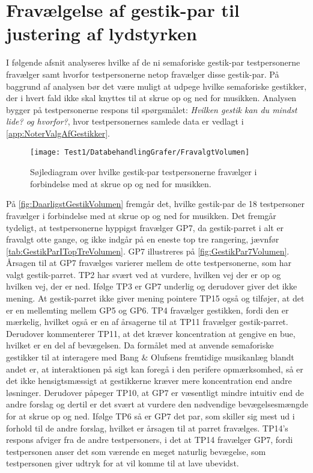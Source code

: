\section{Fravælgelse af gestik-par til justering af lydstyrken}
\label{app:TestresultaterVolumenDaarlig}
%
I følgende afsnit analyseres hvilke af de ni semaforiske gestik-par testpersonerne fravælger samt hvorfor testpersonerne netop fravælger disse gestik-par. På baggrund af analysen bør det være muligt at udpege hvilke semaforiske gestikker, der i hvert fald ikke skal knyttes til at skrue op og ned for musikken. Analysen bygger på testpersonerne respons til spørgsmålet: \textit{Hvilken gestik kan du mindst lide? og hvorfor?}, hvor testpersonernes samlede data er vedlagt i \autoref{app:NoterValgAfGestikker}.
%
\begin{figure}[H]
	\centering
	\texttt{[image: Test1/DatabehandlingGrafer/FravalgtVolumen]}
	\caption{Søjlediagram over hvilke gestik-par testpersonerne fravælger i forbindelse med at skrue op og ned for musikken.}
	\label{fig:DaarligstGestikVolumen}
\end{figure}
\noindent
%
På \autoref{fig:DaarligstGestikVolumen} fremgår det, hvilke gestik-par de 18 testpersoner fravælger i forbindelse med at skrue op og ned for musikken. Det fremgår tydeligt, at testpersonerne hyppigst fravælger GP7, da gestik-parret i alt er fravalgt otte gange, og ikke indgår på en eneste top tre rangering, jævnfør \autoref{tab:GestikParITopTreVolumen}. GP7 illustreres på \autoref{fig:GestikPar7Volumen}. Årsagen til at GP7 fravælges varierer mellem de otte testpersonerne, som har valgt gestik-parret. TP2 har svært ved at vurdere, hvilken vej der er op og hvilken vej, der er ned. Ifølge TP3 er GP7 underlig og derudover giver det ikke mening. At gestik-parret ikke giver mening pointere TP15 også og tilføjer, at det er en mellemting mellem GP5 og GP6. TP4 fravælger gestikken, fordi den er mærkelig, hvilket også er en af årsagerne til at TP11 fravælger gestik-parret. Derudover kommenterer TP11, at det kræver koncentration at gengive en bue, hvilket er en del af bevægelsen. Da formålet med at anvende semaforiske gestikker til at interagere med Bang $\&$ Olufsens fremtidige musikanlæg blandt andet er, at interaktionen på sigt kan foregå i den perifere opmærksomhed, så er det ikke hensigtsmæssigt at gestikkerne kræver mere koncentration end andre løsninger. Derudover påpeger TP10, at GP7 er væsentligt mindre intuitiv end de andre forslag og dertil er det svært at vurdere den nødvendige bevægelsesmængde for at skrue op og ned. Ifølge TP6 så er GP7 det par, som skiller sig mest ud i forhold til de andre forslag, hvilket er årsagen til at parret fravælges. TP14's respons afviger fra de andre testpersoners, i det at TP14 fravælger GP7, fordi testpersonen anser det som værende en meget naturlig bevægelse, som testpersonen giver udtryk for at vil komme til at lave ubevidst.
